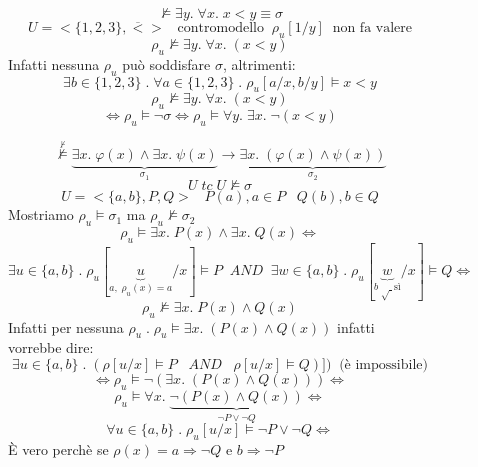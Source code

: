 \documentclass{article}
\theoremstyle{break}
\theoremstyle{break}
\theoremstyle{break}
\theoremstyle{break}
\begin{document}
\begin{figure}[H]
  \begin{exercise}[a casa]
    \[
    \not\models \exists y.\; \forall x.\; x < y \equiv \sigma 
    \] 
    \[
    U = < \{1,2,3\}, \overline{<}> \;\;\; \text{contromodello} \;\; \rho_u[1/y] \;\; \text{non fa valere}
    \] 
    \[
    \rho_u \not\models \exists y.\; \forall x.\; (x < y)
    \] 
    Infatti nessuna \( \rho_u \) può soddisfare \( \sigma  \), altrimenti:
    \[
      \exists b \in \{1, 2, 3\} \;.\; \forall a \in \{1,2,3\} \;.\; \rho_u[a/x,b/y] \models x < y 
    \] 
    \[
    \rho_u \not\models \exists y.\; \forall x.\; (x < y)
    \] 
    \[
    \Leftrightarrow \rho_u \models \neg \sigma \Leftrightarrow \rho_u \models \forall y.\; \exists x.\; \neg(x < y)
    \] 
  \end{exercise}
\end{figure}

\begin{figure}[H]
  \begin{exercise}
    \[
      \stackrel{\not\vdash}{\not\models} \underbrace{\exists x.\; \varphi(x) \wedge \exists x.\; \psi(x)}_{\sigma_1} \to \underbrace{\exists x.\; (\varphi(x) \wedge \psi(x))}_{\sigma_2}
    \]
    \[
    U \;tc\; U \not\models \sigma 
    \] 
    \[
    U = <\{a,b\}, P, Q> \;\;\; P(a), a \in P \;\;\; Q(b), b \in Q
    \] 
    Mostriamo \( \rho_u \models \sigma_1  \) ma \( \rho_u \not\models \sigma_2 \)
    \[
    \rho_u \models \exists x.\; P(x) \wedge \exists x.\; Q(x) \Leftrightarrow
    \] 
    \[
      \exists u \in \{a,b\} \;.\; \rho_u[\underbrace{u}_{a,\; \rho_u(x) = a}/x] \models P \;\;AND\;\; \exists w \in \{a,b\} \;.\; \rho_u[\underbrace{w}_{b\; \surd\; \text{sì}}/x] \models Q \Leftrightarrow
    \] 
    \[
      \rho_u \not\models \exists x.\; P(x) \wedge Q(x)
    \] 
    Infatti per nessuna \( \rho_u \;.\; \rho_u \models \exists x.\; (P(x) \wedge Q(x))\) infatti
    vorrebbe dire:
    \[
      \exists u \in \{a,b\} \;.\; (\rho[u/x] \models P \;\;\; AND \;\;\; \rho[u/x] \models Q)])\;\;\text{(è impossibile)}
    \] 
    \[
    \Leftrightarrow \rho_u \models \neg(\exists x.\; (P(x) \wedge Q(x))) \Leftrightarrow
    \] 
    \[
      \rho_u \models \forall x.\; \underbrace{\neg(P(x) \wedge Q(x))}_{\neg P \vee \neg Q} \Leftrightarrow
    \] 
    \[
    \forall u \in \{a,b\} \;.\; \rho_u[u/x] \models \neg P \vee \neg Q \Leftrightarrow
    \] 
    È vero perchè se \( \rho(x) = a \Rightarrow \neg Q \)  e \( b \Rightarrow \neg P \) 
  \end{exercise}
\end{figure}
\end{document}
